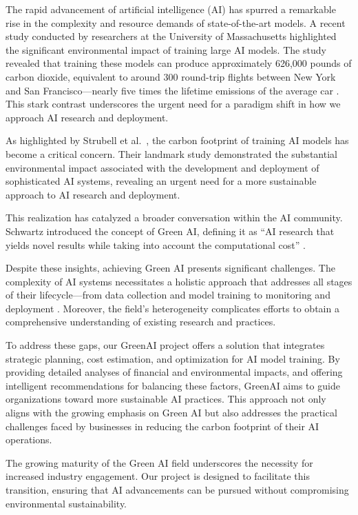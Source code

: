 \documentclass{report}
\begin{document}
The rapid advancement of artificial intelligence (AI) has spurred a remarkable rise in the complexity and resource demands of state-of-the-art models. A recent study conducted by researchers at the University of Massachusetts highlighted the significant environmental impact of training large AI models. The study revealed that training these models can produce approximately 626,000 pounds of carbon dioxide, equivalent to around 300 round-trip flights between New York and San Francisco—nearly five times the lifetime emissions of the average car \cite{strubell2019}. This stark contrast underscores the urgent need for a paradigm shift in how we approach AI research and deployment.

As highlighted by Strubell et al.~\cite{strubell2019}, the carbon footprint of training AI models has become a critical concern. Their landmark study demonstrated the substantial environmental impact associated with the development and deployment of sophisticated AI systems, revealing an urgent need for a more sustainable approach to AI research and deployment.

This realization has catalyzed a broader conversation within the AI community. Schwartz introduced the concept of Green AI, defining it as “AI research that yields novel results while taking into account the computational cost” \cite{schwartz2020}.

Despite these insights, achieving Green AI presents significant challenges. The complexity of AI systems necessitates a holistic approach that addresses all stages of their lifecycle—from data collection and model training to monitoring and deployment \cite{haakman2021}. Moreover, the field’s heterogeneity complicates efforts to obtain a comprehensive understanding of existing research and practices.

To address these gaps, our GreenAI project offers a solution that integrates strategic planning, cost estimation, and optimization for AI model training. By providing detailed analyses of financial and environmental impacts, and offering intelligent recommendations for balancing these factors, GreenAI aims to guide organizations toward more sustainable AI practices. This approach not only aligns with the growing emphasis on Green AI but also addresses the practical challenges faced by businesses in reducing the carbon footprint of their AI operations.

The growing maturity of the Green AI field underscores the necessity for increased industry engagement. Our project is designed to facilitate this transition, ensuring that AI advancements can be pursued without compromising environmental sustainability.
\end{document}
